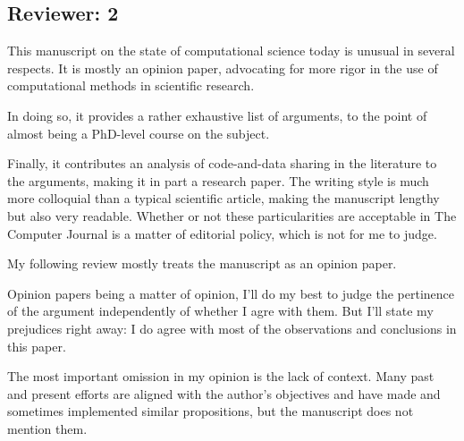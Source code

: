 \documentclass[11pt]{article}
\begin{document}
\subsection{Reviewer: 2}

This manuscript on the state of computational science today is unusual in several respects. It is mostly an opinion paper, advocating for more rigor in the use of computational methods in scientific research. 

In doing so, it provides a rather exhaustive list of arguments, to the point of almost being a PhD-level course on the subject. 

Finally, it contributes an analysis of code-and-data sharing in the literature to the arguments, making it in part a research paper. The writing style is much more colloquial than a typical scientific article, making the manuscript lengthy but also very readable. Whether or not these particularities are acceptable in The Computer Journal is a matter of editorial policy, which is not for me to judge. 

My following review mostly treats the manuscript as an opinion paper.

Opinion papers being a matter of opinion, I'll do my best to judge the pertinence of the argument independently of whether I agre with them. But I'll state my prejudices right away: I do agree with most of the observations and conclusions in this paper. 

The most important omission in my opinion is the lack of context. Many past and present efforts are aligned with the author's objectives and have made and sometimes implemented similar propositions, but the manuscript does not mention them. 
\end{document}
